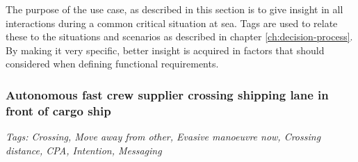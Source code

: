 The purpose of the use case, as described in this section is to give insight in all interactions during a common critical situation at sea. Tags are used to relate these to the situations and scenarios as described in chapter \ref{ch:decision-process}. By making it very specific, better insight is acquired in factors that should considered when defining functional requirements. 

\subsubsection{Autonomous fast crew supplier crossing shipping lane in front of cargo ship}

\emph{Tags: Crossing, Move away from other, Evasive manoeuvre now, Crossing distance, \ac{CPA}, Intention, Messaging}

